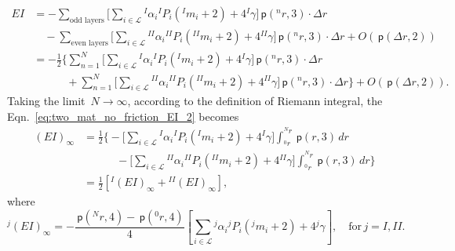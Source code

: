 \documentclass[preprint,10pt,times]{elsarticle}
\numberwithin{equation}{section}
\newcommand{\pr}[1]{\left( #1 \right)}
\newcommand{\p}{\,\mathsf{p}}
\renewcommand{\>}{$\Rightarrow$}
\begin{document}
\begin{equation}
	\begin{aligned}
		EI & = -\sum_{\text{odd layers}} \bigg[ \sum_{i \in \mathcal{L}} {}^{I}\!{\alpha_{i}} {}^{I}\!{P_{i}} ({}^{I}\!{m_{i}} + 2) + 4{}^{I}\!\gamma \bigg] \p\pr{{}^{n}\!{r},3} \cdot \Delta r \\ & \quad{} -\sum_{\text{even layers}} \bigg[ \sum_{i \in \mathcal{L}} {}^{II}\!{\alpha_{i}} {}^{II}\!{P_{i}} ({}^{II}\!{m_{i}} + 2) + 4{}^{II}\!\gamma \bigg] \p\pr{{}^{n}\!{r},3} \cdot \Delta r + O(\p\pr{\Delta r,2}) \\
		 & = -\frac{1}{2}
		 \bigg\lbrace
		 \sum_{n=1}^N \bigg[ \sum_{i \in \mathcal{L}} {}^{I}\!{\alpha_{i}} {}^{I}\!{P_{i}} ({}^{I}\!{m_{i}} + 2) + 4{}^{I}\!\gamma \bigg] \p\pr{{}^{n}\!{r},3} \cdot \Delta r \\ & \quad\qquad{} + \sum_{n=1}^N \bigg[ \sum_{i \in \mathcal{L}} {}^{II}\!{\alpha_{i}} {}^{II}\!{P_{i}} ({}^{II}\!{m_{i}} + 2) + 4{}^{II}\!\gamma \bigg] \p\pr{{}^{n}\!{r},3} \cdot \Delta r
		 \bigg\rbrace + O(\p\pr{\Delta r,2}).
	\end{aligned}
	\label{eq:two_mat_no_friction_EI_2}
\end{equation}
Taking the limit~$N \to \infty$, according to the definition of Riemann integral, the Eqn.~\eqref{eq:two_mat_no_friction_EI_2} becomes
\begin{equation}
	 \begin{aligned}
	   (EI)_{\infty} & = \frac{1}{2}  \Biggl \{
	   		- \Biggl[ \sum_{i \in \mathcal{L}} {}^{I}\!{\alpha_{i}} {}^{I}\!{P_{i}} ({}^{I}\!{m_{i}} + 2) + 4{}^{I}\!\gamma \Biggr]
			\int_{{}^{0}\!{r}}^{{}^{N}\!{r}} \p\pr{r,3} \, dr \\ & \quad\qquad{}
			- \Biggl[ \sum_{i \in \mathcal{L}} {}^{II}\!{\alpha_{i}} {}^{II}\!{P_{i}} ({}^{II}\!{m_{i}} + 2) + 4{}^{II}\!\gamma \Biggr]
			\int_{{}^{0}\!{r}}^{{}^{N}\!{r}} \p\pr{r,3} \, dr
	    \Biggl \} \\
	    & = \frac{1}{2} \left[ {}^{I}(EI)_{\infty} + {}^{II}(EI)_{\infty} \right],
	 \end{aligned}
	\label{eq:two_mat_no_friction_EI}
\end{equation}
where
\begin{equation}
	{}^{j}(EI)_{\infty} = - \frac{\p\pr{{}^{N}\!{r},4} - \p\pr{{}^{0}\!{r},4}}{4} \left[ \sum_{i \in \mathcal{L}} {}^{j}\!{\alpha_{i}} {}^{j}\!{P_{i}} ({}^{j}\!{m_{i}} + 2 ) + 4{}^{j}\!\gamma\right], \quad \text{for} \, j = I, II.
\end{equation}
\end{document}
